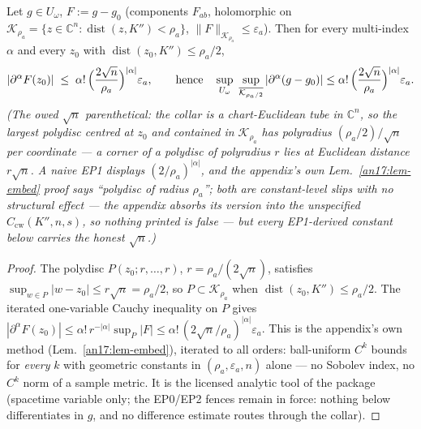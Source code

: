 \begin{lemma}\label{pac:lem-EP1}
Let $g\in U_\omega$, $F:=g-g_0$ (components $F_{ab}$, holomorphic on
$\mathcal K_{\rho_a}=\{z\in\mathbb C^n:\operatorname{dist}(z,K'')<
\rho_a\}$, $\|F\|_{\mathcal K_{\rho_a}}\le\varepsilon_a$). Then for
every multi-index $\alpha$ and every $z_0$ with
$\operatorname{dist}(z_0,K'')\le\rho_a/2$,
\begin{equation}\label{pac:eq-EP1}
  |\partial^\alpha F(z_0)|\;\le\;\alpha!\,
  \Bigl(\frac{2\sqrt n}{\rho_a}\Bigr)^{|\alpha|}\varepsilon_a ,
  \qquad\text{hence}\quad
  \sup_{U_\omega}\ \sup_{\overline{\mathcal K_{\rho_a/2}}}
  |\partial^\alpha(g-g_0)|\le\alpha!\,
  \Bigl(\frac{2\sqrt n}{\rho_a}\Bigr)^{|\alpha|}\varepsilon_a .
\end{equation}
\emph{(The owed $\sqrt n$ parenthetical: the collar is a chart-Euclidean
tube in $\mathbb C^n$, so the largest polydisc centred at $z_0$ and
contained in $\mathcal K_{\rho_a}$ has polyradius
$(\rho_a/2)/\sqrt n$ per coordinate --- a corner of a polydisc of
polyradius $r$ lies at Euclidean distance $r\sqrt n$. A naive
EP1 displays $(2/\rho_a)^{|\alpha|}$, and the appendix's own
Lem.~\ref{an17:lem-embed} proof says ``polydisc of radius $\rho_a$'';
both are constant-level slips with no structural effect --- the
appendix absorbs its version into the unspecified
$C_{\mathrm{cw}}(K'',n,s)$, so nothing printed is false --- but every
EP1-derived constant below carries the honest $\sqrt n$.)}
\end{lemma}
\begin{proof}
The polydisc $P(z_0;r,\dots,r)$, $r=\rho_a/(2\sqrt n)$, satisfies
$\sup_{w\in P}|w-z_0|\le r\sqrt n=\rho_a/2$, so
$P\subset\mathcal K_{\rho_a}$ when
$\operatorname{dist}(z_0,K'')\le\rho_a/2$. The iterated one-variable
Cauchy inequality on $P$ gives
$|\partial^\alpha F(z_0)|\le\alpha!\,r^{-|\alpha|}
\sup_P|F|\le\alpha!\,(2\sqrt n/\rho_a)^{|\alpha|}\varepsilon_a$.
This is the appendix's own method (Lem.~\ref{an17:lem-embed}), iterated to all orders: ball-uniform $C^k$ bounds for
\emph{every} $k$ with geometric constants in $(\rho_a,\varepsilon_a,n)$
alone --- no Sobolev index, no $C^k$ norm of a sample metric. It is
the licensed analytic tool of the package (spacetime variable only;
the EP0/EP2 fences remain in force: nothing below
differentiates in $g$, and no difference estimate routes through the
collar).
\end{proof}


